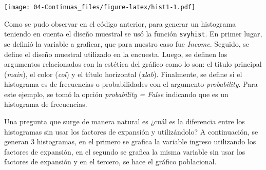 \documentclass[
  12pt,
]{book}
\newenvironment{Shaded}{\begin{snugshade}}{\end{snugshade}}
\newcommand{\AttributeTok}[1]{\textcolor[rgb]{0.77,0.63,0.00}{#1}}
\newcommand{\ConstantTok}[1]{\textcolor[rgb]{0.00,0.00,0.00}{#1}}
\newcommand{\DecValTok}[1]{\textcolor[rgb]{0.00,0.00,0.81}{#1}}
\newcommand{\FunctionTok}[1]{\textcolor[rgb]{0.00,0.00,0.00}{#1}}
\newcommand{\NormalTok}[1]{#1}
\newcommand{\SpecialCharTok}[1]{\textcolor[rgb]{0.00,0.00,0.00}{#1}}
\newcommand{\StringTok}[1]{\textcolor[rgb]{0.31,0.60,0.02}{#1}}
\begin{document}
\texttt{[image: 04-Continuas\_files/figure-latex/hist1-1.pdf]}

Como se pudo observar en el código anterior, para generar un histograma teniendo en cuenta el diseño muestral se usó la función \texttt{svyhist}. En primer lugar, se definió la variable a graficar, que para nuestro caso fue \emph{Income}. Seguido, se define el diseño muestral utilizado en la encuesta. Luego, se definen los argumentos relacionados con la estética del gráfico como lo son: el título principal (\emph{main}), el color (\emph{col}) y el título horizontal (\emph{xlab}). Finalmente, se define si el histograma es de frecuencias o probabilidades con el argumento \emph{probability}. Para este ejemplo, se tomó la opción \emph{probability = False} indicando que es un histograma de frecuencias.

Una pregunta que surge de manera natural es ¿cuál es la diferencia entre los histogramas sin usar los factores de expansión y utilizándolo? A continuación, se generan 3 histogramas, en el primero se grafica la variable ingreso utilizando los factores de expansión, en el segundo se grafica la misma variable sin usar los factores de expansión y en el tercero, se hace el gráfico poblacional.

\begin{Shaded}
\end{Shaded}
\end{document}
